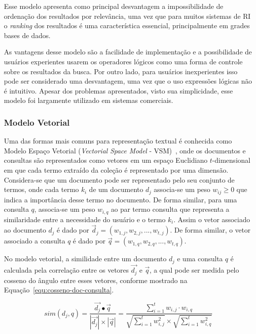 Esse modelo apresenta como principal desvantagem a impossibilidade de ordenação dos resultados por relevância, uma vez que para muitos sistemas de RI o \textit{ranking} dos resultados é uma característica essencial, principalmente em grades bases de dados. 

As vantagens desse modelo são a facilidade de implementação e a possibilidade de usuários experientes usarem os operadores lógicos como uma forma de controle sobre os resultados da busca. Por outro lado, para usuários inexperientes isso pode ser considerado uma desvantagem, uma vez que o uso expressões lógicas não é intuitivo. Apesar dos problemas apresentados, visto sua simplicidade, esse modelo foi largamente utilizado em sistemas comerciais. 



\subsubsection{Modelo Vetorial}


Uma das formas mais comuns para representação textual é conhecida como Modelo Espaço Vetorial (\textit{Vectorial Space Model} - VSM)~\cite{Rezende2003}, onde os documentos e consultas são representados como vetores em um espaço Euclidiano $t$-dimensional em que cada termo extraído da coleção é representado por uma dimensão. 
% 
Considera-se que um documento pode ser representado pelo seu conjunto de termos, onde cada termo $k_i$ de um documento $d_j$ associa-se um peso $w_{ij}\geq0$ que indica a importância desse termo no documento. 
%
De forma similar, para uma consulta $q$, associa-se um peso $w_{i,q}$ ao par termo consulta que representa a similaridade entre a necessidade do usuário e o termo $k_i$. 
%
Assim o vetor associado ao documento $d_j$ é dado por $\vec{d}_{j} = (w_{1,j}, w_{2,j}, ..., w_{t,j})$. 
%
De forma similar, o vetor associado a consulta $q$ é dado por $\vec{q} = (w_{1,q}, w_{2,q}, ..., w_{t,q})$.


No modelo vetorial, a similidade entre um documento $d_j$ e uma consulta $q$ é calculada pela correlação entre os vetores $\vec{d_j}$ e $\vec{q}$, a qual pode ser medida pelo cosseno do  ângulo entre esses vetores, conforme mostrado na Equação~\ref{equ:cosseno-doc-consulta}.



\begin{equation}
sim(d_j, q) = \frac{ \vec{d_j} \bullet \vec{q} }
                   { |\vec{d_j}| \times | \vec{q}|}
            = \frac{ \sum_{i=1}^{t} w_{i,j} \cdot w_{i,q} }
                   { \sqrt{\sum_{i=1}^{t} w_{i,j}^2} \times \sqrt{\sum_{i=1}^{t} w_{i,q}^2 } }                   \label{equ:cosseno-doc-consulta}		                   
\end{equation} 



